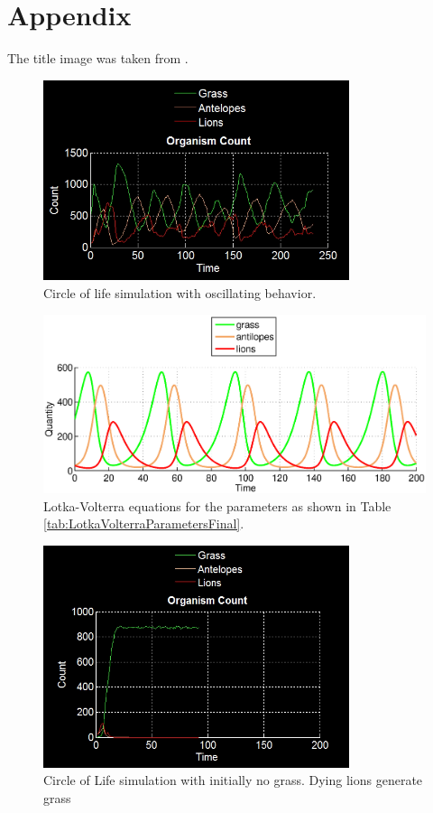 \documentclass[11pt]{article}
\begin{document}
\section{Appendix}
The title image was taken from \cite{titleImage}.
\begin{figure}
\centering
\includegraphics[width=0.8\textwidth]{circleOfLifeOscillating.png}
\caption{Circle of life simulation with oscillating behavior.}
\label{fig:CircleOfLifeOscillating}
\end{figure}
\begin{figure}
\centering
\includegraphics[scale=0.85]{LotkaVolterraThreeAdjusted}
\caption{Lotka-Volterra equations for the parameters as shown in Table \ref{tab:LotkaVolterraParametersFinal}.}
\label{fig:LotkaVolterraThreeAdjusted}
\end{figure}

\begin{figure}
\centering
\includegraphics[width=0.8\textwidth]{noGrassOnlyCount.png}
\caption{Circle of Life simulation with initially no grass. Dying lions generate grass}
\label{fig:noGrass}
\end{figure}
\end{document}
